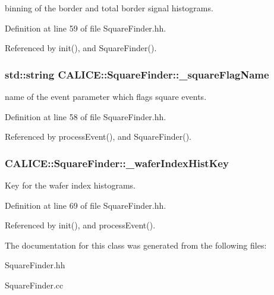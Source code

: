 binning of the border and total border signal histograms. 



Definition at line 59 of file Square\-Finder.\-hh.



Referenced by init(), and Square\-Finder().

\subsubsection[{\-\_\-square\-Flag\-Name}]{\setlength{\rightskip}{0pt plus 5cm}std\-::string C\-A\-L\-I\-C\-E\-::\-Square\-Finder\-::\-\_\-square\-Flag\-Name\hspace{0.3cm}{\ttfamily [protected]}}\label{classCALICE_1_1SquareFinder_a559678746ea01e5a0b4dc1c09901493d}


name of the event parameter which flags square events. 



Definition at line 58 of file Square\-Finder.\-hh.



Referenced by process\-Event(), and Square\-Finder().

\subsubsection[{\-\_\-wafer\-Index\-Hist\-Key}]{ C\-A\-L\-I\-C\-E\-::\-Square\-Finder\-::\-\_\-wafer\-Index\-Hist\-Key\hspace{0.3cm}{\ttfamily [private]}}\label{classCALICE_1_1SquareFinder_adaf8926d3a1970aafb20e34852f21cbc}


Key for the wafer index histograms. 



Definition at line 69 of file Square\-Finder.\-hh.



Referenced by init(), and process\-Event().



The documentation for this class was generated from the following files\-:\begin{DoxyCompactItemize}
\item 
Square\-Finder.\-hh\item 
Square\-Finder.\-cc\end{DoxyCompactItemize}
